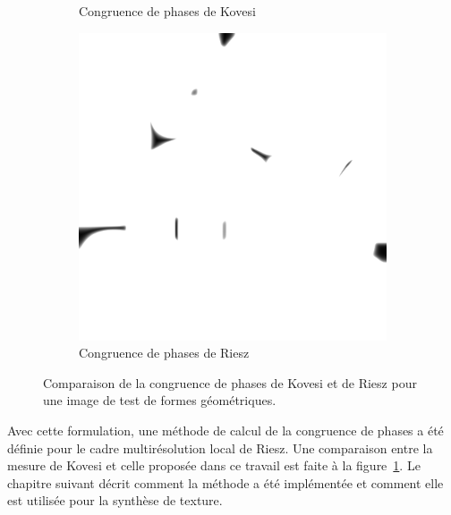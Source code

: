 \begin{figure}
\begin{subfigure}{.3\textwidth}
        \caption{Congruence de phases de Kovesi}
    \end{subfigure}
    \hfill
    \begin{subfigure}{.3\textwidth}
        \centering
        \includegraphics[width=\textwidth]{contenu/resources/images/geometric_shapes_pc_riesz}
        \caption{Congruence de phases de Riesz}
    \end{subfigure}

    \caption[Comparaison de la congruence de phases de Kovesi et de Riesz pour une image de test de formes géométriques]{Comparaison de la congruence de phases de Kovesi et de Riesz pour une image de test de formes géométriques.}
    \label{fig:phase-congruency-riesz}
\end{figure}

\bigskip

Avec cette formulation, une méthode de calcul de la congruence de phases a été définie pour le cadre multirésolution local de Riesz. Une comparaison entre la mesure de Kovesi et celle proposée dans ce travail est faite à la figure~\ref{fig:phase-congruency-riesz}. Le chapitre suivant décrit comment la méthode a été implémentée et comment elle est utilisée pour la synthèse de texture.